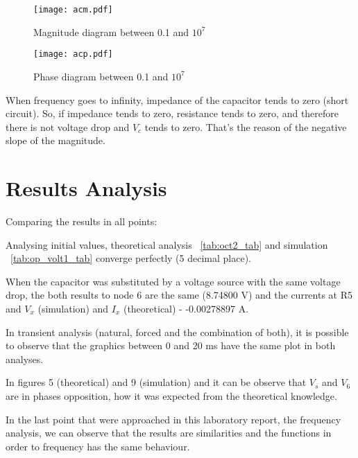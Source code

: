 \begin{figure}[h] \centering
\texttt{[image: acm.pdf]}
\caption{Magnitude diagram between 0.1 and $10^7$}
\label{fig:acm}
\end{figure}

\begin{figure}[h] \centering
\texttt{[image: acp.pdf]}
\caption{Phase diagram between 0.1 and $10^7$}
\label{fig:acp}
\end{figure}



When frequency goes to infinity, impedance of the capacitor tends to zero (short circuit). So, if impedance tends to zero, resistance tends to zero, and therefore there is not voltage drop and $V_c$ tends to zero. That's the reason of the negative slope  of the magnitude.








\newpage
\section{Results Analysis}
\label{sec:resultsanalysis}

Comparing the results in all points:

Analysing initial values, theoretical analysis ~\ref{tab:oct2_tab} and simulation ~\ref{tab:op_volt1_tab} converge perfectly (5 decimal place).

When the capacitor was substituted by a voltage source with the same voltage drop, the both results to node 6 are the same (8.74800 V) and the currents at R5 and $V_x$ (simulation) and $I_x$ (theoretical) - -0.00278897 A. 

In transient analysis (natural, forced and the combination of both), it is possible to observe that the graphics between 0 and 20 ms have the same plot in both analyses. 

In figures 5 (theoretical) and 9 (simulation) and it can be observe that $V_s$ and $V_6$ are in phases opposition, how it was expected from the theoretical knowledge.

In the last point that were approached in this laboratory report, the frequency analysis, we can observe that the results are similarities and the functions in order to frequency has the same behaviour.